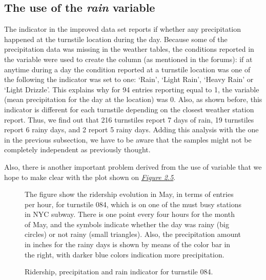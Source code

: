 \documentclass[a4paper,12pt,english]{sphinxmanual}
\begin{document}
\subsection{The use of the \emph{rain} variable}
\label{section1:the-use-of-the-rain-variable}
The  indicator in the improved data set reports if whether any
precipitation happened at the turnstile location during the day. Because some of
the precipitation data was missing in the weather tables, the conditions
reported in the  variable were used to create the  column (as
mentioned in the forums): if at anytime during a day the condition reported at
a turnstile location was one of the following the  indicator was set to
one: `Rain', `Light Rain', `Heavy Rain' or `Light Drizzle'. This explains why
for 94 entries reporting  equal to 1, the  variable (mean
precipitation for the day at the location) was 0. Also, as shown before, this
indicator is different for each turnstile depending on the closest weather
station report. Thus, we find out that 216 turnstiles report 7 days of rain,
19 turnstiles report 6 rainy days, and 2 report 5 rainy days. Adding this
analysis with the one in the previous subsection, we have to be aware that the
samples might not be completely independent as previously thought.

Also, there is another important problem derived from the use of  variable
that we hope to make clear with the plot shown on {\hyperref[section1:figure25]{\emph{Figure 2.5}}}.
\begin{figure}[htbp]
\centering
\capstart

\caption{Ridership, precipitation and rain indicator for turnstile 084.}{\small 
The figure show the ridership evolution in May, in terms of entries per hour,
for turnstile 084, which is on one of the must busy stations in NYC subway.
There is one point every four hours for the month of May, and the symbols
indicate whether the day was rainy (big circles) or not rainy (small
triangles). Also, the precipitation amount in inches for the rainy days is
shown by means of the color bar in the right, with darker blue colors
indication more precipitation.
}\label{section1:figure25}\end{figure}
\end{document}
